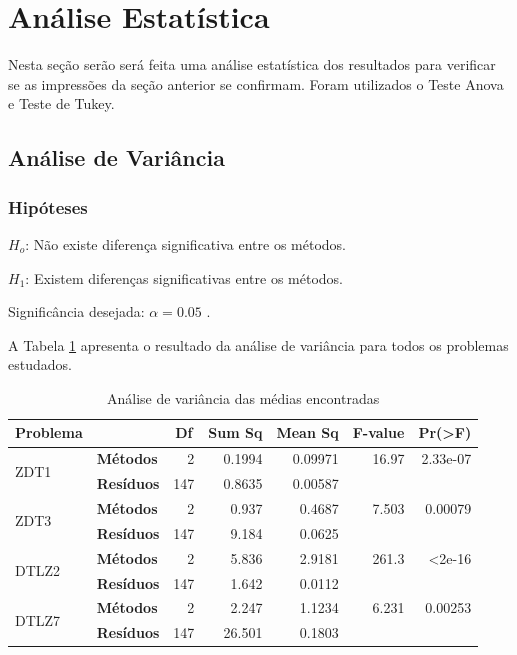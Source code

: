 \section{Análise Estatística}

Nesta seção serão será feita uma análise estatística dos resultados para verificar se as impressões da seção anterior se confirmam. Foram utilizados o Teste Anova e Teste de Tukey.


\subsection{Análise de Variância}

\subsubsection*{Hipóteses}

$ H_o$: Não existe diferença significativa entre os métodos. %

$ H_1$: Existem diferenças significativas entre os métodos. %

Significância desejada: $ \alpha=0.05$ .

A Tabela \ref{tab:anova} apresenta o resultado da análise de variância para todos os problemas estudados. 

\begin{table}[!htb]
	\centering
	\caption{Análise de variância das médias encontradas}
	\label{tab:anova}
	\begin{tabular}{|llrrrrr|}
		\toprule
		\textbf{Problema} & & \multicolumn{1}{c}{\textbf{Df}} & \multicolumn{1}{c}{\textbf{Sum Sq}} & \multicolumn{1}{c}{\textbf{Mean Sq}} & \multicolumn{1}{c}{\textbf{F-value}} & \multicolumn{1}{c|}{\textbf{Pr(>F)}} \\ \hline
		\multirow{2}{*}{ZDT1} & \textbf{Métodos}  & 2 	& 0.1994 & 0.09971 & 16.97 & 2.33e-07 \\
							  &	\textbf{Resíduos} & 147 & 0.8635 & 0.00587 &  	   & \\ \hline
								
		\multirow{2}{*}{ZDT3} &	\textbf{Métodos} 	&2	 & 0.937	&  0.4687 	 & 7.503 &	0.00079 \\
							  & \textbf{Resíduos} 	&147 & 9.184	 & 0.0625	 &		 &  \\ \hline
		\multirow{2}{*}{DTLZ2}& \textbf{Métodos} 	&2 & 5.836 & 2.9181 &  261.3& <2e-16 \\
							  & \textbf{Resíduos} 	&147 & 1.642&  0.0112 	 &		 &  \\ \hline			  
		\multirow{2}{*}{DTLZ7} & \textbf{Métodos}   &     2 & 2.247&  1.1234  & 6.231& 0.00253 \\
							   & \textbf{Resíduos} 	&  147  & 26.501 & 0.1803 & &  \\ \bottomrule		
								
	\end{tabular}
\end{table}


